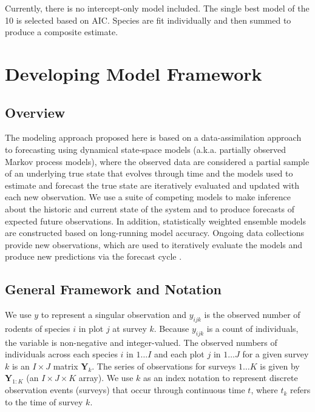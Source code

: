 \documentclass{article}
\begin{document}
Currently, there is no intercept-only model included. The single best model of the 10 is selected based on AIC. Species are fit individually and then summed to produce a composite estimate. 

\section{Developing Model Framework}
\label{sec:devmods}

\subsection{Overview}
\label{subsec:devmods_ov}

The modeling approach proposed here is based on a data-assimilation approach to forecasting using dynamical state-space models (a.k.a. partially observed Markov process models), where the observed data are considered a partial sample of an underlying true state that evolves through time \citep{Ionides2006, King2016} and the models used to estimate and forecast the true state are iteratively evaluated and updated with each new observation. We use a suite of competing models to make inference about the historic and current state of the system and to produce forecasts of expected future observations. In addition, statistically weighted ensemble models are constructed based on long-running model accuracy. Ongoing data collections provide new observations, which are used to iteratively evaluate the models and produce new predictions via the forecast cycle \citep{Dietze2017}. 

\subsection{General Framework and Notation}
\label{subsec:devmods_gf}

We use $y$ to represent a singular observation and $y_{ijk}$ is the observed number of rodents of species $i$ in plot $j$ at survey $k$. Because $y_{ijk}$ is a count of individuals, the variable is non-negative and integer-valued. The observed numbers of individuals across each species $i$ in $1 \ldots I$ and each plot $j$ in $1 \ldots J$ for a given survey $k$ is an $I \times J$ matrix $\textbf{Y}_k$. The series of observations for surveys $1 \ldots K$ is given by $\textbf{Y}_{1:K}$ (an $I \times J \times K$ array). We use $k$ as an index notation to represent discrete observation events (surveys) that occur through continuous time $t$, where $t_k$ refers to the time of survey $k$.
\end{document}
